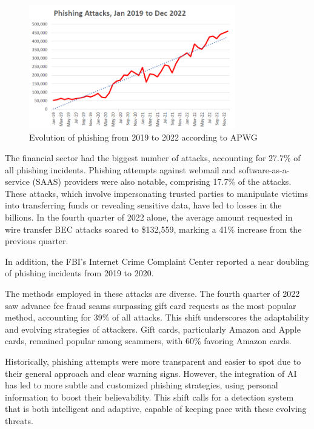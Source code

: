\documentclass{article}
\begin{document}
    \begin{figure}[H]
        \centering
        \includegraphics[width=0.8\textwidth]{report_img/shartincreasingphishing}
        \caption{Evolution of phishing from 2019 to 2022 according to APWG\cite{PhishingActivityTrendsReport}}
        \label{fig:figure}
    \end{figure}

    The financial sector had the biggest number of attacks, accounting for 27.7\% of all phishing incidents.
    Phishing attempts against webmail and software-as-a-service (SAAS) providers were also notable, comprising 17.7\% of the attacks.
    These attacks, which involve impersonating trusted parties to manipulate victims into transferring funds or revealing sensitive data, have led to losses in the billions.
    In the fourth quarter of 2022 alone, the average amount requested in wire transfer BEC attacks soared to \$132,559, marking a 41\% increase from the previous quarter.

    In addition, the FBI’s Internet Crime Complaint Center reported a near doubling of phishing incidents from 2019 to 2020.

    The methods employed in these attacks are diverse.
    The fourth quarter of 2022 saw advance fee fraud scams surpassing gift card requests as the most popular method, accounting for 39\% of all attacks.
    This shift underscores the adaptability and evolving strategies of attackers.
    Gift cards, particularly Amazon and Apple cards, remained popular among scammers, with 60\% favoring Amazon cards.

    Historically, phishing attempts were more transparent and easier to spot due to their general approach and clear warning signs.
    However, the integration of AI has led to more subtle and customized phishing strategies, using personal information to boost their believability.
    This shift calls for a detection system that is both intelligent and adaptive, capable of keeping pace with these evolving threats.
\end{document}
